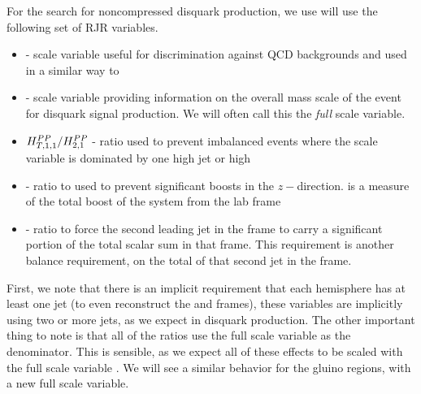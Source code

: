 For the search for noncompressed disquark production, we use will use the following set of RJR variables.
\begin{itemize}
\item {} - scale variable useful for discrimination against QCD backgrounds and used in a similar way to \met
\item {} - scale variable providing information on the overall mass scale of the event for disquark signal production.  We will often call this the \textit{full} scale variable.
\item $H^{{PP}}_{T,1,1}/H^{{PP}}_{2,1} $ - ratio used to prevent imbalanced events where the scale variable is dominated by one high \pT jet or high \met
\item \pzlabratioTwo - ratio to used to prevent significant boosts in the $z-$direction.  \pzlab is a measure of the total boost of the \PP system from the lab frame
\item \ptjTworatio - ratio to force the second leading jet in the \PP frame to carry a significant portion of the total scalar sum in that frame.  This requirement is another balance requirement, on the total \pT of that second jet in the \PP frame.
\end{itemize}
First, we note that there is an implicit requirement that each hemisphere has at least one jet (to even reconstruct the \Pa and \Pb frames), these variables are implicitly using two or more jets, as we expect in disquark production.
The other important thing to note is that all of the ratios use the full scale variable as the denominator.
This is sensible, as we expect all of these effects to be scaled with the full scale variable .
We will see a similar behavior for the gluino regions, with a new full scale variable.

